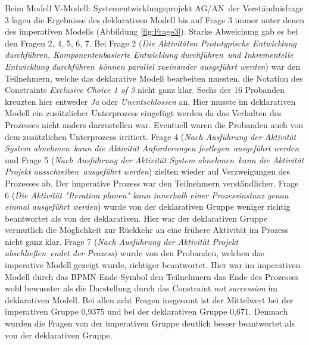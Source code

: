Beim Modell \grqq V-Modell: Systementwicklungsprojekt AG/AN\grqq \ der Verständnisfrage 3 lagen die Ergebnisse des deklarativen Modell bis auf Frage 3 immer unter denen des imperativen Modells (Abbildung \ref{fig:Frage3}). Starke Abweichung gab es bei den Fragen 2, 4, 5, 6, 7. \newline
Bei Frage 2 (\textit{Die Aktivitäten \grqq Prototypische Entwicklung durchführen\grqq, \grqq Komponentenbasierte Entwicklung durchführen\grqq \ und \grqq Inkrementelle Entwicklung durchführen\grqq \ können parallel zueinander ausgeführt werden}) war den Teilnehmern, welche das deklarative Modell bearbeiten mussten, die Notation des Constraints \textit {Exclusive Choice 1 of 3} nicht ganz klar. Sechs der 16 Probanden kreuzten hier entweder \textit{Ja} oder \textit{Unentschlossen} an. Hier musste im deklarativen Modell ein zusätzlicher Unterprozess eingefügt werden da das Verhalten des Prozesses nicht anders darzustellen war. Eventuell waren die Probanden auch von dem zusätzlichen Unterprozess irritiert.\newline
Frage 4 (\textit{Nach Ausführung der Aktivität \grqq System abnehmen\grqq \ kann die Aktivität \grqq Anforderungen festlegen\grqq \ ausgeführt werden} und Frage 5 (\textit{Nach Ausführung der Aktivität \grqq System abnehmen\grqq \ kann die Aktivität \grqq Projekt ausschreiben\grqq \ ausgeführt werden}) zielten wieder auf Verzweigungen des Prozesses ab. Der imperative Prozess war den Teilnehmern verständlicher. \newline
Frage 6 (\textit{Die Aktivität "Iteration planen" kann innerhalb einer Prozessinstanz genau einmal ausgeführt werden}) wurde von der deklarativen Gruppe weniger richtig beantwortet als von der deklarativen. Hier war der deklarativen Gruppe vermutlich die Möglichkeit zur Rückkehr an eine frühere Aktivität im Prozess nicht ganz klar. \newline
Frage 7 (\textit{Nach Ausführung der Aktivität \grqq Projekt abschließen\grqq \ endet der Prozess}) wurde von den Probanden, welchen das imperative Modell gezeigt wurde, richtiger beantwortet. Hier war im imperativen Modell durch das BPMN-Ende-Symbol den Teilnehmern das Ende des Prozesses wohl bewusster als die Darstellung durch das Constraint \textit{not succession} im deklarativen Modell.\newline
Bei allen acht Fragen insgesamt ist der Mittelwert bei der imperativen Gruppe 0,9375 und bei der deklarativen Gruppe 0,671. Demnach wurden die Fragen von der imperativen Gruppe deutlich besser beantwortet als von der deklarativen Gruppe. \newline


